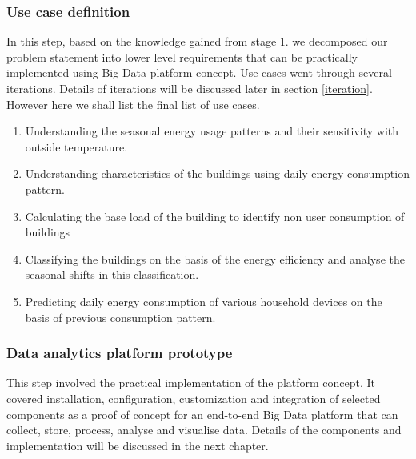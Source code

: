 \subsubsection{Use case definition} \label{usecases}
In this step, based on the knowledge gained from stage 1. we decomposed our problem statement into lower level requirements that can be practically implemented using Big Data platform concept. Use cases went through several iterations. Details of iterations will be discussed later in section \ref{iteration}. However here we shall list the final list of use cases.
\begin{enumerate}
\item Understanding the seasonal energy usage patterns and their sensitivity with outside temperature.
\item Understanding characteristics of the buildings using daily energy consumption pattern.
\item Calculating the base load of the building to identify non user consumption of buildings
\item Classifying the buildings on the basis of the energy efficiency and analyse the seasonal shifts in this classification.
\item Predicting daily energy consumption of various household devices on the basis of previous consumption pattern.
\end{enumerate}
\subsubsection{Data analytics platform prototype}
This step involved the practical implementation of the platform concept. It covered installation, configuration, customization and integration of selected components as a proof of concept for an end-to-end Big Data platform that can collect, store, process, analyse and visualise data. Details of the components and implementation will be discussed in the next chapter.

